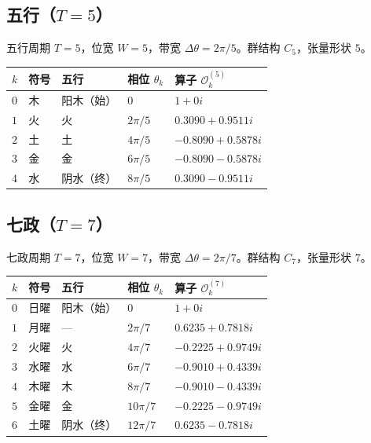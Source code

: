\subsection{\texorpdfstring{五行（$T=5$）}{五行（T=5）}}

\begin{definition}[五行相位算子]\label{def:wuxing_operators}
五行周期 $T=5$，位宽 $W=5$，带宽 $\Delta\theta=2\pi/5$。群结构 $C_5$，张量形状 $5$。
\end{definition}

\begin{center}
\begin{tabular}{>{\centering\arraybackslash}p{1.2cm}>{\centering\arraybackslash}p{1.5cm}>{\centering\arraybackslash}p{1.5cm}>{\centering\arraybackslash}p{2.5cm}>{\centering\arraybackslash}p{4cm}}
\toprule
$k$ & 符号 & 五行 & 相位 $\theta_k$ & 算子 $\mathcal{O}_k^{(5)}$ \\
\midrule
$0$ & 木 & 阳木（始） & $0$ & $1+0i$ \\
$1$ & 火 & 火 & $2\pi/5$ & $0.3090+0.9511i$ \\
$2$ & 土 & 土 & $4\pi/5$ & $-0.8090+0.5878i$ \\
$3$ & 金 & 金 & $6\pi/5$ & $-0.8090-0.5878i$ \\
$4$ & 水 & 阴水（终） & $8\pi/5$ & $0.3090-0.9511i$ \\
\bottomrule
\end{tabular}
\end{center}

\subsection{\texorpdfstring{七政（$T=7$）}{七政（T=7）}}

\begin{definition}[七政相位算子]\label{def:qizheng_operators}
七政周期 $T=7$，位宽 $W=7$，带宽 $\Delta\theta=2\pi/7$。群结构 $C_7$，张量形状 $7$。
\end{definition}

\begin{center}
\begin{tabular}{>{\centering\arraybackslash}p{1.2cm}>{\centering\arraybackslash}p{1.5cm}>{\centering\arraybackslash}p{1.5cm}>{\centering\arraybackslash}p{2.5cm}>{\centering\arraybackslash}p{4cm}}
\toprule
$k$ & 符号 & 五行 & 相位 $\theta_k$ & 算子 $\mathcal{O}_k^{(7)}$ \\
\midrule
$0$ & 日曜 & 阳木（始） & $0$ & $1+0i$ \\
$1$ & 月曜 & --- & $2\pi/7$ & $0.6235+0.7818i$ \\
$2$ & 火曜 & 火 & $4\pi/7$ & $-0.2225+0.9749i$ \\
$3$ & 水曜 & 水 & $6\pi/7$ & $-0.9010+0.4339i$ \\
$4$ & 木曜 & 木 & $8\pi/7$ & $-0.9010-0.4339i$ \\
$5$ & 金曜 & 金 & $10\pi/7$ & $-0.2225-0.9749i$ \\
$6$ & 土曜 & 阴水（终） & $12\pi/7$ & $0.6235-0.7818i$ \\
\bottomrule
\end{tabular}
\end{center}

